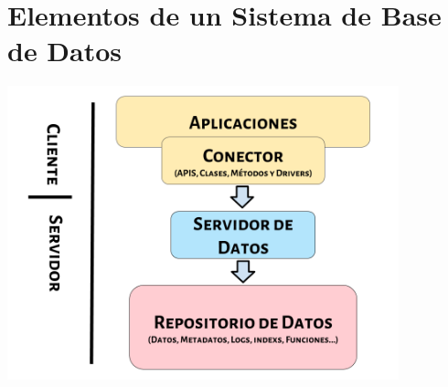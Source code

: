 \documentclass[12pt, fleqn]{report}                             %
\begin{document}
        \clearpage
        \section{Elementos de un Sistema de Base de Datos}

            \includegraphics[width=0.85\textwidth]{DiagramaPartes.png}
\end{document}
